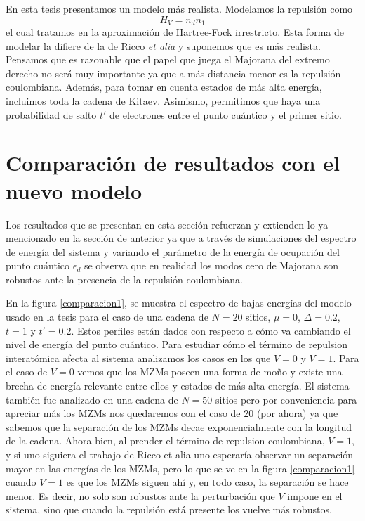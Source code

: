 En esta tesis presentamos un modelo m\'{a}s realista. Modelamos la repulsi\'{o}n como 
\begin{equation}
    H_V=n_d n_1
\end{equation}
el cual tratamos en la aproximaci\'{o}n de Hartree-Fock irrestricto. Esta forma de modelar la difiere de la de Ricco \emph{et alia} y suponemos que es m\'{a}s realista. Pensamos que es razonable que el papel que juega el Majorana del extremo derecho no ser\'{a} muy importante ya que a m\'{a}s distancia menor es la repulsi\'{o}n coulombiana. Adem\'{a}s, para tomar en cuenta estados de m\'{a}s alta energ\'{i}a, incluimos toda la cadena de Kitaev. Asimismo, permitimos que haya una probabilidad de salto $t'$ de electrones entre el punto cu\'{a}ntico y el primer sitio.
%
%
\section{Comparaci\'{o}n de resultados con el nuevo modelo} Los resultados que se presentan en esta secci\'{o}n refuerzan y extienden lo ya mencionado en la secci\'{o}n de anterior ya que a trav\'{e}s de simulaciones del espectro de energ\'{i}a del sistema y variando el par\'{a}metro de la energ\'{i}a de ocupaci\'{o}n del punto cu\'{a}ntico $\epsilon_d$ se observa que en realidad los modos cero de Majorana son robustos ante la presencia de la repulsi\'{o}n coulombiana.

En la figura \ref{comparacion1}, se muestra el espectro de bajas energ\'{i}as del modelo usado en la tesis para el caso de una cadena de $N=20$ sitios, $\mu=0$, $\Delta=0.2$, $t=1$ y $t'=0.2$. Estos perfiles est\'{a}n dados con respecto a c\'{o}mo va cambiando el nivel de energ\'{i}a del punto cu\'{a}ntico. Para estudiar c\'{o}mo el t\'{e}rmino de repulsion interat\'{o}mica afecta al sistema analizamos los casos en los que $V=0$ y $V=1$. Para el caso de $V=0$ vemos que los MZMs poseen una forma de mo\~{n}o y existe una brecha de energ\'{i}a relevante entre ellos y estados de m\'{a}s alta energ\'{i}a. El sistema tambi\'{e}n fue analizado en una cadena de $N=50$ sitios pero por conveniencia para apreciar m\'{a}s los MZMs nos quedaremos con el caso de $20$ (por ahora) ya que sabemos que la separaci\'{o}n de los MZMs decae exponencialmente con la longitud de la cadena. Ahora bien, al prender el t\'{e}rmino de repulsion coulombiana, $V=1$, y si uno siguiera el trabajo de Ricco et alia uno esperar\'{i}a observar un separaci\'{o}n mayor en las energ\'{i}as de los MZMs, pero lo que se ve en la figura \ref{comparacion1} cuando $V=1$ es que los MZMs siguen ah\'{i} y, en todo caso, la separaci\'{o}n se hace menor. Es decir, no solo son robustos ante la perturbaci\'{o}n que $V$ impone en el sistema, sino que cuando la repulsi\'{o}n est\'{a} presente los vuelve m\'{a}s robustos.\\

